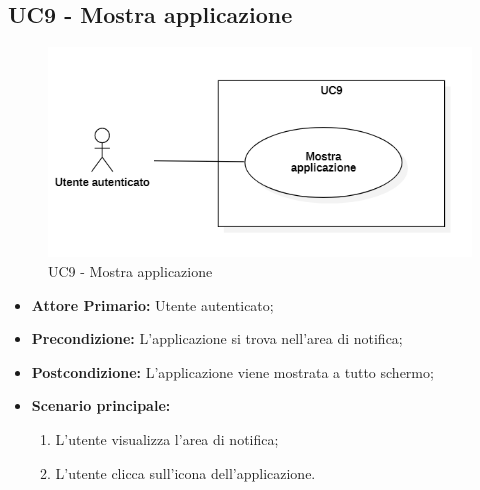 \subsection{UC9 - Mostra applicazione}
\begin{figure}[H]
    \centering
    \includegraphics[scale = 0.7]{components/img/UC9.png}
    \caption{UC9 - Mostra applicazione}
\end{figure}
\begin{itemize}
\item \textbf{Attore Primario:} Utente autenticato;
\item \textbf{Precondizione:} L'applicazione si trova nell'area di notifica;
\item \textbf{Postcondizione:} L'applicazione viene mostrata a tutto schermo;
\item \textbf{Scenario principale:}
    \begin{enumerate}
    \item L'utente visualizza l'area di notifica;
    \item L'utente clicca sull'icona dell'applicazione.
    \end{enumerate}
\end{itemize}
